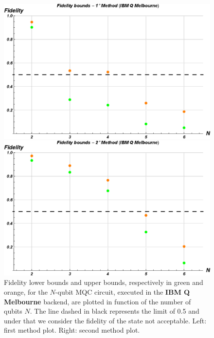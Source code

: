 \begin{figure}[h!]
\begin{minipage}[c]{0.5\linewidth}
\hspace{1cm}
\centering \includegraphics[width=1\textwidth]{./chapter3/graphics_IBM/real_device/F1Metodo_ibmqmelbourne.eps}
\end{minipage}
\begin{minipage}[]{0.5\linewidth}
\centering \includegraphics[width=1\textwidth]{./chapter3/graphics_IBM/real_device/F2Metodo_ibmqmelbourne.eps}
\end{minipage}
\caption{\label{Fidelity_RealDevice_ibmqmelbourne} Fidelity lower bounds and upper bounds, respectively in green and orange, for the $N$-qubit MQC circuit, executed in the \textbf{IBM Q Melbourne} backend, are plotted in function of the number of qubits $N$. The line dashed in black represents the limit of 0.5 and under that we consider the fidelity of the state not acceptable. Left: first method plot. Right: second method plot.}
\end{figure}





